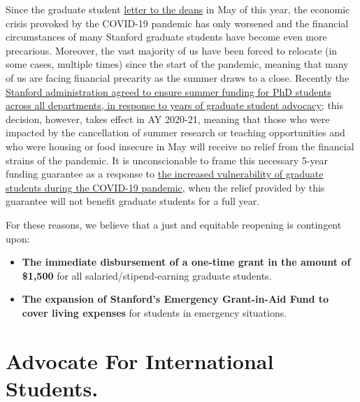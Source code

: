 \documentclass[12pt, titlepage, letterpaper]{article}
\begin{document}
Since the graduate student \href{https://medium.com/@stanfordsolidaritynetwork/5-demands-from-stanford-graduate-students-in-response-to-the-covid-19-crisis-7b03f6c50485}{letter to the deans} in May of this year, the economic crisis provoked by the COVID-19 pandemic has only worsened and the financial circumstances of many Stanford graduate students have become even more precarious. Moreover, the vast majority of us have been forced to relocate (in some cases, multiple times) since the start of the pandemic, meaning that many of us are facing financial precarity as the summer draws to a close. Recently the \href{https://medium.com/@stanfordsolidaritynetwork/stanford-promises-all-phd-students-five-years-of-guaranteed-12-month-funding-4c1cb5b2f412}{Stanford administration agreed to ensure summer funding for PhD students across all departments, in response to years of graduate student advocacy}; this decision, however, takes effect in AY 2020-21, meaning that those who were impacted by the cancellation of summer research or teaching opportunities and who were housing or food insecure in May will receive no relief from the financial strains of the pandemic. It is unconscionable to frame this necessary 5-year funding guarantee as a response to \href{https://news.stanford.edu/2020/07/23/stanford-commits-12-month-funding-phd-students/}{the increased vulnerability of graduate students during the COVID-19 pandemic}, when the relief provided by this guarantee will not benefit graduate students for a full year.

For these reasons, we believe that a just and equitable reopening is contingent upon:

\begin{itemize}
    \item \textbf{The immediate disbursement of a one-time grant in the amount of \$1,500} for all salaried/stipend-earning graduate students.
    \item \textbf{The expansion of Stanford’s Emergency Grant-in-Aid Fund to cover living expenses} for students in emergency situations.
\end{itemize}

\newpage
\section*{Advocate For International Students.}
%

\vspace{.5em} %
\hline\hline
\end{document}
